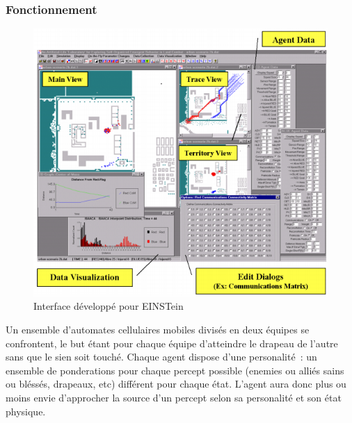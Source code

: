 \documentclass{article}
\begin{document}
\subsubsection{Fonctionnement}

\begin{center}
\begin{figure}[H]
	\begin{centering}
	\includegraphics[width=0.9\linewidth]{../ressources/Einstein}
	\caption{Interface développé pour EINSTein}
	\end{centering}
\end{figure}
\cite{simu_guerre,ilachinski1994,ilachinski1999}
\end{center}

Un ensemble d'automates cellulaires mobiles divisés en deux équipes se confrontent, le but étant pour chaque équipe d'atteindre le drapeau de l'autre sans que le sien soit touché. Chaque agent dispose d'une personalité~: un ensemble de ponderations pour chaque percept possible (enemies ou alliés sains ou bléssés, drapeaux, etc) différent pour chaque état. L'agent aura donc plus ou moins envie d'approcher la source d'un percept selon sa personalité et son état physique.
\end{document}
